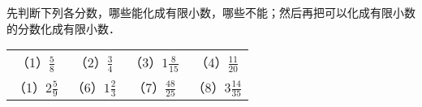 
先判断下列各分数，哪些能化成有限小数，哪些不能；然后再把可以化成有限小数的分数化成有限小数．\\
\begin{center}
	\begin{tabular}{cccc}
	（1）$\frac{5}{8}$ \hspace{6em}  & （2）$\frac{3}{4}$ \hspace{6em} & （3）$1\frac{8}{15}$ \hspace{6em}  & （4）$\frac{11}{20}$ \hspace{6em} \\
	（1）$2\frac{5}{9}$ \hspace{6em}  & （6）$1\frac{2}{3}$ \hspace{6em} & （7）$\frac{48}{25}$ \hspace{6em}  & （8）$3\frac{14}{35}$ \hspace{6em} \\
\end{tabular}
\end{center}

